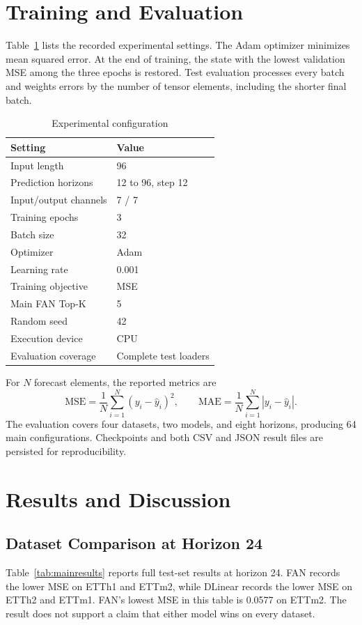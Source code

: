 \documentclass[conference,10pt]{IEEEtran}
\begin{document}
\section{Training and Evaluation}
Table~\ref{tab:settings} lists the recorded experimental settings. The Adam optimizer minimizes mean squared error. At the end of training, the state with the lowest validation MSE among the three epochs is restored. Test evaluation processes every batch and weights errors by the number of tensor elements, including the shorter final batch.

\begin{table}[t]
\caption{Experimental configuration}
\label{tab:settings}
\centering
\footnotesize
\begin{tabular}{@{}p{}p{}@{}}
\toprule
Setting & Value\\
\midrule
Input length & 96\\
Prediction horizons & 12 to 96, step 12\\
Input/output channels & 7 / 7\\
Training epochs & 3\\
Batch size & 32\\
Optimizer & Adam\\
Learning rate & 0.001\\
Training objective & MSE\\
Main FAN Top-K & 5\\
Random seed & 42\\
Execution device & CPU\\
Evaluation coverage & Complete test loaders\\
\bottomrule
\end{tabular}
\end{table}

For $N$ forecast elements, the reported metrics are
\begin{equation}
\mathrm{MSE}=\frac{1}{N}\sum_{i=1}^{N}(y_i-\hat{y}_i)^2,
\qquad
\mathrm{MAE}=\frac{1}{N}\sum_{i=1}^{N}|y_i-\hat{y}_i|.
\end{equation}
The evaluation covers four datasets, two models, and eight horizons, producing 64 main configurations. Checkpoints and both CSV and JSON result files are persisted for reproducibility.

\section{Results and Discussion}
\subsection{Dataset Comparison at Horizon 24}
Table~\ref{tab:mainresults} reports full test-set results at horizon 24. FAN records the lower MSE on ETTh1 and ETTm2, while DLinear records the lower MSE on ETTh2 and ETTm1. FAN's lowest MSE in this table is 0.0577 on ETTm2. The result does not support a claim that either model wins on every dataset.
\end{document}
